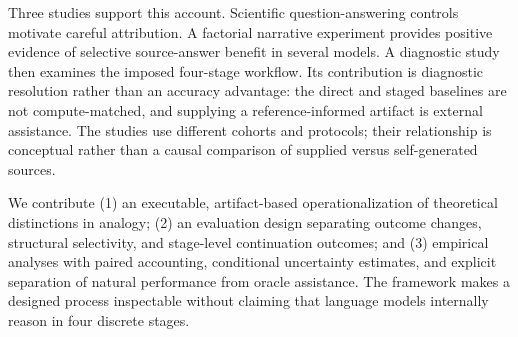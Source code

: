 Three studies support this account. Scientific question-answering controls motivate careful attribution. A factorial narrative experiment provides positive evidence of selective source-answer benefit in several models. A diagnostic study then examines the imposed four-stage workflow. Its contribution is diagnostic resolution rather than an accuracy advantage: the direct and staged baselines are not compute-matched, and supplying a reference-informed artifact is external assistance. The studies use different cohorts and protocols; their relationship is conceptual rather than a causal comparison of supplied versus self-generated sources.

We contribute (1) an executable, artifact-based operationalization of theoretical distinctions in analogy; (2) an evaluation design separating outcome changes, structural selectivity, and stage-level continuation outcomes; and (3) empirical analyses with paired accounting, conditional uncertainty estimates, and explicit separation of natural performance from oracle assistance. The framework makes a designed process inspectable without claiming that language models internally reason in four discrete stages.

